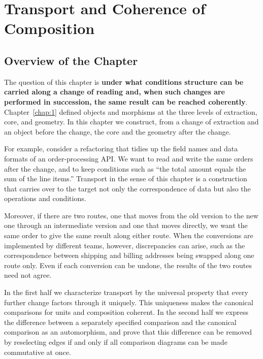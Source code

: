 \chapter{Transport and Coherence of Composition}\label{chap:4}

\section*{Overview of the Chapter}

The question of this chapter is \textbf{under what conditions structure can be carried along
a change of reading and, when such changes are performed in succession, the same result can
be reached coherently}.
Chapter~\ref{chap:1} defined objects and morphisms at the three levels of extraction, core,
and geometry. In this chapter we construct, from a change of extraction and an object before
the change, the core and the geometry after the change.

For example, consider a refactoring that tidies up the field names and data formats of an
order-processing API. We want to read and write the same orders after the change, and to
keep conditions such as ``the total amount equals the sum of the line items.'' Transport in
the sense of this chapter is a construction that carries over to the target not only the
correspondence of data but also the operations and conditions.

Moreover, if there are two routes, one that moves from the old version to the new one through an
intermediate version and one that moves directly, we want the same order to give the
same result along either route. When the conversions are implemented by different teams,
however, discrepancies can arise, such as the correspondence between shipping and billing
addresses being swapped along one route only. Even if each conversion can be undone, the
results of the two routes need not agree.

In the first half we characterize transport by the universal property that every further
change factors through it uniquely. This uniqueness makes the canonical comparisons for
units and composition coherent. In the second half we express the difference between a
separately specified comparison and the canonical comparison as an automorphism, and prove
that this difference can be removed by reselecting edges if and only if all comparison
diagrams can be made commutative at once.

